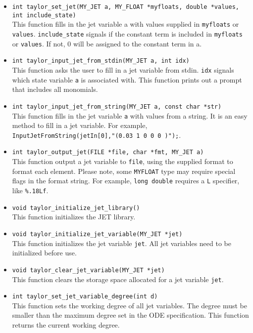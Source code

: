 \documentclass[10pt]{article}
\theoremstyle{remark}
\newcommand{\myfloat}{{\tt MY\symbol{95}FLOAT}}
\begin{document}
\begin{itemize}
\item{\verb+int taylor_set_jet(MY_JET a, MY_FLOAT *myfloats, double *values, int include_state)+\\
    This function fills in the jet variable a with values supplied in
    \verb+myfloats+ or \verb+values+. \verb+include_state+ signals if
    the constant term is included in \verb+myfloats+ or
    \verb+values+. If not, 0 will be assigned to the constant term in
    a. }
    
\item{\verb+int taylor_input_jet_from_stdin(MY_JET a, int idx)+\\
    This function asks the user to fill in a jet variable from stdin.
    \verb+idx+ signals which state variable \verb+a+ is associated
    with.  This function prints out a prompt that includes all
    monomials.}
    
\item{\verb+int taylor_input_jet_from_string(MY_JET a, const char *str)+\\
    This function fills in the jet variable \verb+a+ with values from
    a string. It is an easy method to fill in a jet variable. For
    example, \verb+InputJetFromString(jetIn[0],"(0.03 1 0 0 0 )");+.}
    
\item \verb+int taylor_output_jet(FILE *file, char *fmt, MY_JET a)+\\
    This function output a jet variable to \verb+file+, using the
    supplied format to format each element. Please note, some
    \myfloat{} type may require special flags in the format
    string. For example, \verb+long double+ requires a \verb+L+
    specifier, like \verb+%.18Lf+.

\item{\verb+void taylor_initialize_jet_library()+\\    
    This function initializes the JET library. }
    
\item{\verb+void taylor_initialize_jet_variable(MY_JET *jet)+\\
    This function initializes the jet variable \verb+jet+. All jet
    variables need to be initialized before use.}
    
\item{\verb+void taylor_clear_jet_variable(MY_JET *jet)+\\
  This function clears the storage space allocated for a jet variable
  \verb+jet+.}
  
\item{\verb+int taylor_set_jet_variable_degree(int d)+\\
    This function sets the working degree of all jet variables.  The
    degree must be smaller than the maximum degree set in the ODE
    specification.  This function returns the current working degree.}
    

\end{itemize}
\end{document}
